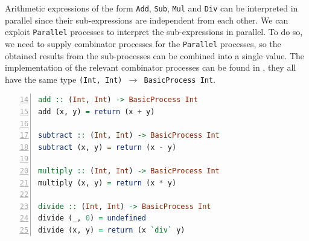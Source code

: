 Arithmetic expressions of the form \texttt{Add}, \texttt{Sub}, \texttt{Mul} and \texttt{Div} can be interpreted in parallel since their sub-expressions are independent from each other. We can exploit \texttt{Parallel} processes to interpret the sub-expressions in parallel. To do so, we need to supply combinator processes for the \texttt{Parallel} processes, so the obtained results from the sub-processes can be combined into a single value. The implementation of the relevant combinator processes can be found in , they all have the same type \texttt{(Int, Int) $\to$ BasicProcess Int}.
\begin{lstlisting}[language=Haskell, caption=Basic processes for the combination of results from processes that have been executed in parallel., label=lst:arith_combinators,numbers=left, frame=bt, firstnumber=14]
add :: (Int, Int) -> BasicProcess Int
add (x, y) = return (x + y)

subtract :: (Int, Int) -> BasicProcess Int
subtract (x, y) = return (x - y)

multiply :: (Int, Int) -> BasicProcess Int
multiply (x, y) = return (x * y)

divide :: (Int, Int) -> BasicProcess Int
divide (_, 0) = undefined
divide (x, y) = return (x `div` y)
\end{lstlisting}



